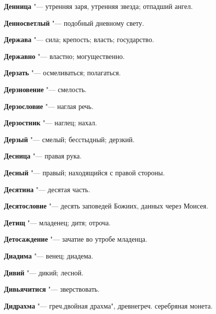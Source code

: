 \begin{mymulticols}{2}
\noindent\textbf{Денница} "--- утренняя заря, утренняя звезда; отпадший ангел. 




\noindent\textbf{Денносветлый} "--- подобный дневному свету. 




\noindent\textbf{Держава} "--- сила; крепость; власть; государство. 




\noindent\textbf{Державно} "--- властно; могущественно. 




\noindent\textbf{Дерзать} "--- осмеливаться; полагаться. 




\noindent\textbf{Дерзновение} "--- смелость. 




\noindent\textbf{Дерзословие} "--- наглая речь. 




\noindent\textbf{Дерзостник} "--- наглец; нахал. 




\noindent\textbf{Дерзый} "--- смелый; бесстыдный; дерзкий. 




\noindent\textbf{Десница} "--- правая рука. 




\noindent\textbf{Десный} "--- правый; находящийся с правой стороны. 




\noindent\textbf{Десятина} "--- десятая часть. 




\noindent\textbf{Десятословие} "--- десять заповедей Божиих, данных через Моисея. 




\noindent\textbf{Детищ} "--- младенец; дитя; отроча. 




\noindent\textbf{Детосаждение} "--- зачатие во утробе младенца. 




\noindent\textbf{Диадима} "--- венец; диадема. 




\noindent\textbf{Дивий} "--- дикий; лесной. 




\noindent\textbf{Дивьячитися} "--- зверствовать. 




\noindent\textbf{Дидрахма} "--- греч.двойная драхма", древнегреч. серебряная монета. 





\end{mymulticols}
